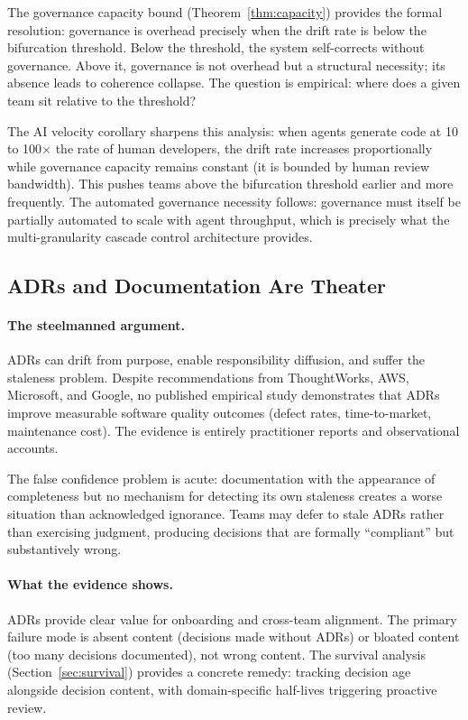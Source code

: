 \documentclass[11pt, a4paper, logo, copyright]{googledeepmind}
\begin{document}
The governance capacity bound (Theorem~\ref{thm:capacity}) provides the formal
resolution: governance is overhead precisely when the drift rate is below the
bifurcation threshold.  Below the threshold, the system self-corrects without
governance.  Above it, governance is not overhead but a structural necessity;
its absence leads to coherence collapse.  The question is empirical: where does
a given team sit relative to the threshold?

The AI velocity corollary sharpens this analysis: when agents generate code at
10 to 100$\times$ the rate of human developers, the drift rate increases
proportionally while governance capacity remains constant (it is bounded by
human review bandwidth).  This pushes teams above the bifurcation threshold
earlier and more frequently.  The automated governance necessity follows:
governance must itself be partially automated to scale with agent throughput,
which is precisely what the multi-granularity cascade control architecture
provides.


\subsection{ADRs and Documentation Are Theater}
\label{sec:contrarian-adrs}

\paragraph{The steelmanned argument.}
ADRs can drift from purpose, enable responsibility diffusion, and suffer the staleness problem. Despite recommendations from ThoughtWorks, AWS, Microsoft, and Google, no published empirical study demonstrates that ADRs improve measurable software quality outcomes (defect rates, time-to-market, maintenance cost). The evidence is entirely practitioner reports and observational accounts.

The false confidence problem is acute: documentation with the appearance of completeness but no mechanism for detecting its own staleness creates a worse situation than acknowledged ignorance. Teams may defer to stale ADRs rather than exercising judgment, producing decisions that are formally ``compliant'' but substantively wrong.

\paragraph{What the evidence shows.}
ADRs provide clear value for onboarding and cross-team alignment. The primary failure mode is absent content (decisions made without ADRs) or bloated content (too many decisions documented), not wrong content. The survival analysis (Section~\ref{sec:survival}) provides a concrete remedy: tracking decision age alongside decision content, with domain-specific half-lives triggering proactive review.
\end{document}
